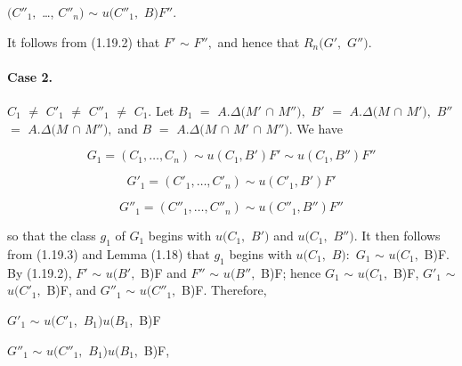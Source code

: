 \documentclass[10pt,a4paper]{article}
\begin{document}
\ensuremath{(C''_1,} \ldots{}, \ensuremath{C''_n)} \ensuremath{\sim{}} \ensuremath{u(C''_1,} \ensuremath{B)F''.}\par

It follows from (1.19.2) that \ensuremath{F'} \ensuremath{\sim{}} \ensuremath{F'',} and hence that \ensuremath{R_n(G',} \ensuremath{G'').}\par

\paragraph{Case 2.} \ensuremath{C_1} \ensuremath{\ne{}} \ensuremath{C'_1} \ensuremath{\ne{}} \ensuremath{C''_1} \ensuremath{\ne{}} \ensuremath{C_1.} Let \ensuremath{B_1} \ensuremath{=} \ensuremath{A.\Delta{}(M'} \ensuremath{\cap{}} \ensuremath{M''),} \ensuremath{B'} \ensuremath{=} \ensuremath{A.\Delta{}(M} \ensuremath{\cap{}} \ensuremath{M'),} \ensuremath{B''} \ensuremath{=} \ensuremath{A.\Delta{}(M} \ensuremath{\cap{}} \ensuremath{M''),} and \ensuremath{B} \ensuremath{=} \ensuremath{A.\Delta{}(M} \ensuremath{\cap{}} \ensuremath{M'} \ensuremath{\cap{}} \ensuremath{M'').} We have

\[
G_1 = (C_1, \ldots{}, C_n) \sim{} u(C_1, B')F' \sim{} u(C_1, B'')F''
\]

\[
G'_1 = (C'_1, \ldots{}, C'_n) \sim{} u(C'_1, B')F'
\]

\[
G''_1 = (C''_1, \ldots{}, C''_n) \sim{} u(C''_1, B'')F''
\]

so that the class \ensuremath{g_1} of \ensuremath{G_1} begins with \ensuremath{u(C_1,} \ensuremath{B')} and \ensuremath{u(C_1,} \ensuremath{B'').} It then follows from (1.19.3) and Lemma (1.18) that \ensuremath{g_1} begins with \ensuremath{u(C_1,} \ensuremath{B):} \ensuremath{G_1} \ensuremath{\sim{}} \ensuremath{u(C_1,} B)F. By (1.19.2), \ensuremath{F'} \ensuremath{\sim{}} \ensuremath{u(B',} B)F and \ensuremath{F''} \ensuremath{\sim{}} \ensuremath{u(B'',} B)F; hence \ensuremath{G_1} \ensuremath{\sim{}} \ensuremath{u(C_1,} B)F, \ensuremath{G'_1} \ensuremath{\sim{}} \ensuremath{u(C'_1,} B)F, and \ensuremath{G''_1} \ensuremath{\sim{}} \ensuremath{u(C''_1,} B)F. Therefore,\par

\ensuremath{G'_1} \ensuremath{\sim{}} \ensuremath{u(C'_1,} \ensuremath{B_1)u(B_1,} B)F\par

\ensuremath{G''_1} \ensuremath{\sim{}} \ensuremath{u(C''_1,} \ensuremath{B_1)u(B_1,} B)F,\par
\end{document}
